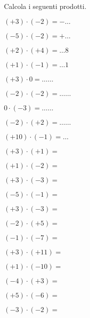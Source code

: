 \begin{esercizio}
 \label{ese:2.16}
Calcola i seguenti prodotti.
\begin{htmulticols}{3}
 \begin{enumeratees}
 \item \((+3)\cdot(-2)=-\ldots\)
 \item \((-5)\cdot(-2)=+\ldots\)
 \item \((+2)\cdot(+4) =\ldots8\)
 \item \((+1)\cdot(-1) =\ldots1\)
 \item \((+3)\cdot0 = \ldots\ldots\)
 \item \((-2)\cdot(-2) =\ldots\ldots\)
 \item \(0\cdot(-3) = \ldots\ldots\)
 \item \((-2)\cdot(+2) =\ldots\ldots\)
 \item \((+10)\cdot(-1) =\ldots\)
 \item \((+3)\cdot(+1) =\)
 \item \((+1)\cdot(-2) =\)
 \item \((+3)\cdot(-3) =\)
 \item \((-5)\cdot(-1) =\)
 \item \((+3)\cdot(-3) =\)
 \item \((-2)\cdot(+5) =\)
 \item \((-1)\cdot(-7) =\)
 \item \((+3)\cdot(+11) =\)
 \item \((+1)\cdot(-10) =\)
 \item \((-4)\cdot(+3) =\)
 \item \((+5)\cdot(-6) =\)
 \item \((-3)\cdot(-2) =\)
 \end{enumeratees}
\end{htmulticols}
\end{esercizio}

